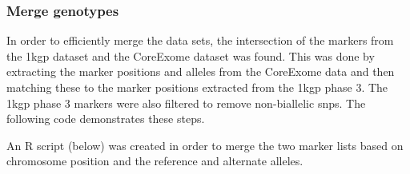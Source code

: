 \documentclass[twoside,openright]{report}
\newenvironment{Shaded}{\begin{snugshade}}{\end{snugshade}}
\newcommand{\StringTok}[1]{\textcolor[rgb]{0.31,0.60,0.02}{#1}}
\newcommand{\CommentTok}[1]{\textcolor[rgb]{0.56,0.35,0.01}{\textit{#1}}}
\newcommand{\FunctionTok}[1]{\textcolor[rgb]{0.00,0.00,0.00}{#1}}
\newcommand{\VariableTok}[1]{\textcolor[rgb]{0.00,0.00,0.00}{#1}}
\newcommand{\ExtensionTok}[1]{#1}
\newcommand{\NormalTok}[1]{#1}
\begin{document}
\subsubsection{Merge genotypes}\label{merge-genotypes}

In order to efficiently merge the data sets, the intersection of the
markers from the \gls{1kgp} dataset and the CoreExome dataset was found.
This was done by extracting the marker positions and alleles from the
CoreExome data and then matching these to the marker positions extracted
from the \gls{1kgp} phase 3. The \gls{1kgp} phase 3 markers were also
filtered to remove non-biallelic \glspl{snp}. The following code
demonstrates these steps.

\begin{Shaded}
\end{Shaded}

An R script (below) was created in order to merge the two marker lists
based on chromosome position and the reference and alternate alleles.
\end{document}
